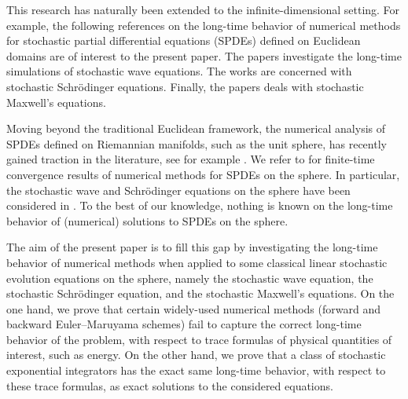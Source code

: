 \documentclass[11pt]{amsart}
\begin{document}
This research has naturally been extended to the infinite-dimensional setting. For example,
the following references on the long-time behavior of numerical methods for stochastic partial differential equations (SPDEs) defined on Euclidean domains are of interest to the present paper. The papers \cite{MR3484400,MR4285774,MR3033008,MR2384109,MR2379913,MR3012932} investigate the long-time simulations of stochastic wave equations. The works \cite{akrivisFiniteDifferenceDiscretization1993,antoineComputationalMethodsDynamics2013,MR3771721,besseRelaxationSchemeNonlinear2004,besseEnergypreservingMethodsNonlinear2021,cohenOnestageExponentialIntegrators2012,MR3007549,sanz-sernaConerservativeNonconservativeSchemes1986} are concerned with stochastic Schr\"odinger equations. Finally,
the papers \cite{MR3432362,MR4077824,MR4410964,MR4739347} deals with stochastic Maxwell's equations.

Moving beyond the traditional Euclidean framework, the numerical analysis of SPDEs defined on Riemannian manifolds,
such as the unit sphere, has recently gained traction in the literature, see for example \cite{MR4161976,MR2370085,Elworthy_1982,MR1246744,MR4059183}. We refer to  \cite{MR4714764,Anh2018,cohen2026fullydiscreteapproximationsemilinear,MR4462619,MR3907363,MR4701212,MR4935789,papi2025,Gia2019} for finite-time convergence results
of numerical methods for SPDEs on the sphere. 
In particular, the stochastic wave and Schrödinger equations on the sphere have been considered in \cite{MR4942808,cohen2026fullydiscreteapproximationsemilinear,MR4462619}.
To the best of our knowledge, nothing is known on the long-time behavior
of (numerical) solutions to SPDEs on the sphere.

The aim of the present paper is to fill this gap by investigating the long-time behavior of numerical methods when applied to some classical
linear stochastic evolution equations on the sphere,
namely the stochastic wave equation, the stochastic Schr\"odinger equation, and the stochastic Maxwell's equations.
On the one hand, we prove that certain widely-used numerical methods (forward and backward Euler--Maruyama schemes) fail to capture the correct long-time behavior of the problem, with respect to trace formulas of physical quantities of interest, such as energy. On the other hand, we prove that a class of stochastic exponential integrators has the exact same long-time behavior, with respect to these trace formulas, as exact solutions to the considered equations.
\end{document}
